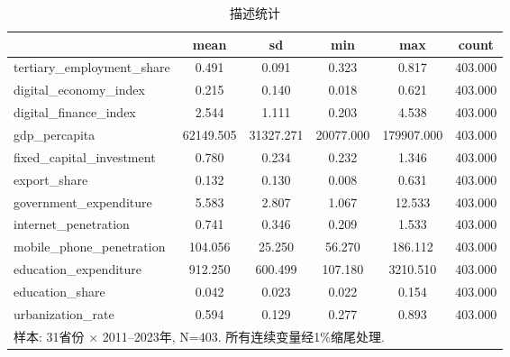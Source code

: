 \begin{table}[htbp]\centering
\def\sym#1{\ifmmode^{#1}\else\(^{#1}\)\fi}
\caption{描述统计}\label{tab:descriptive}
\begin{tabular}{l*{1}{ccccc}}
\hline\hline
            &        mean&          sd&         min&         max&       count\\
\hline
tertiary\_employment\_share&       0.491&       0.091&       0.323&       0.817&     403.000\\
digital\_economy\_index&       0.215&       0.140&       0.018&       0.621&     403.000\\
digital\_finance\_index&       2.544&       1.111&       0.203&       4.538&     403.000\\
gdp\_percapita&   62149.505&   31327.271&   20077.000&  179907.000&     403.000\\
fixed\_capital\_investment&       0.780&       0.234&       0.232&       1.346&     403.000\\
export\_share&       0.132&       0.130&       0.008&       0.631&     403.000\\
government\_expenditure&       5.583&       2.807&       1.067&      12.533&     403.000\\
internet\_penetration&       0.741&       0.346&       0.209&       1.533&     403.000\\
mobile\_phone\_penetration&     104.056&      25.250&      56.270&     186.112&     403.000\\
education\_expenditure&     912.250&     600.499&     107.180&    3210.510&     403.000\\
education\_share&       0.042&       0.023&       0.022&       0.154&     403.000\\
urbanization\_rate&       0.594&       0.129&       0.277&       0.893&     403.000\\
\hline\hline
\multicolumn{6}{l}{\footnotesize 样本: 31省份 × 2011–2023年, N=403. 所有连续变量经1\%缩尾处理.}\\
\end{tabular}
\end{table}
